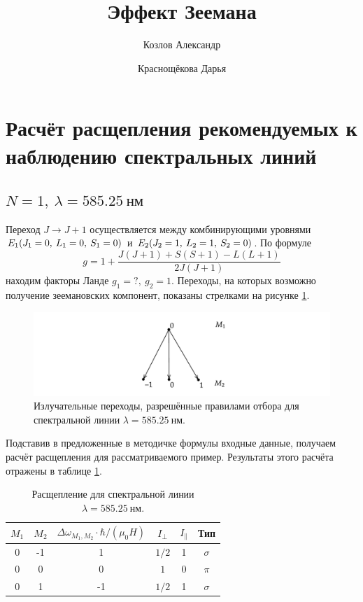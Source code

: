 \documentclass[12pt]{article}
\title{Эффект Зеемана}
\author{Козлов Александр \and Краснощёкова Дарья}
\begin{document}
	

	\tableofcontents
	\newpage

	\section{Расчёт расщепления рекомендуемых к наблюдению спектральных линий}
	\subsection*{$N=1,\:\lambda = 585.25\ \text{нм}$}
	Переход $J \rightarrow J+1$	осуществляется между комбинирующими уровнями $E_1\qty(J_1 = 0,\: L_1 = 0,\: S_1 = 0)$ и $E_2\qty(J_2 = 1,\: L_2 = 1,\: S_2 = 0)$. По формуле 
	\begin{equation}
	 	g = 1 + \dfrac{J(J+1) + S(S+1) - L(L+1)}{2J(J+1)}
	\end{equation}
	находим факторы Ланде $g_1 = ?,\: g_2 = 1$. Переходы, на которых возможно получение зеемановских компонент, показаны стрелками на рисунке \ref{fig:figure1}.
	\begin{figure}[htbp]
		\centering
		\includegraphics[width=1\linewidth]{../images/1.png}
		\caption{Излучательные переходы, разрешённые правилами отбора для спектральной линии $\lambda = 585.25\ \text{нм}$.}
		\label{fig:figure1}
	\end{figure}
	Подставив в предложенные в методичке формулы входные данные, получаем расчёт расщепления для рассматриваемого пример. Результаты этого расчёта отражены в таблице \ref{table:1}.
	\begin{table}[h!]
		\centering
		\begin{tabular}{|c c c c c c|} 
 			\hline
 			$M_1$ & $M_2$ & $\Delta \omega_{M_1, M_2} \cdot \hbar / (\mu_0 H)$ & $I_{\perp}$ & $I_{\|}$ & Тип \\ [0.5ex] 
 			\hline
 			0 & -1 & 1 & $1/2$ & 1 & $\sigma$ \\
 			0 & 0 & 0 & $1$ & 0 & $\pi$ \\
 			0 & 1 & -1 & $1/2$ & 1 & $\sigma$ \\
 			\hline
		\end{tabular}
		\caption{Расщепление для спектральной линии $\lambda = 585.25\ \text{нм}$.}
		\label{table:1}
	\end{table}
\end{document}
